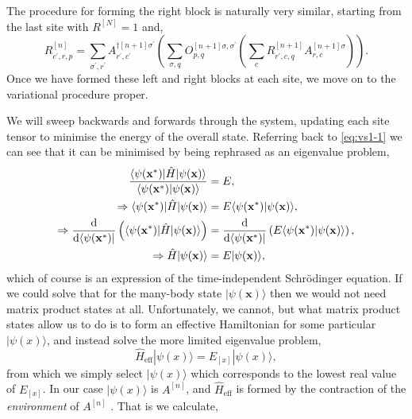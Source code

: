 The procedure for forming the right block is naturally very similar, starting from the last site with \(R^{[N]} = 1\) and,
\begin{equation}
R^{[n]}_{c^{\prime}, r, p} = \sum_{\sigma^{\prime}, r^{\prime}} A^{\dagger [n+1] \sigma^{\prime}}_{r^{\prime}, c^{\prime}} \left( \sum_{\sigma, q} O^{[n+1] \sigma, \sigma^{\prime}}_{p, q} \left( \sum_{c} R^{[n+1]}_{r^{\prime}, c, q} A^{[n+1] \sigma}_{r, c} \right) \right).  
\label{eq:vs1-5}
\end{equation}
Once we have formed these left and right blocks at each site, we move on to the variational procedure proper. 

We will sweep backwards and forwards through the system, updating each site tensor to minimise the energy of the overall state. Referring back to \cref{eq:vs1-1} we can see that it can be minimised by being rephrased as an eigenvalue problem,
\begin{align}
\frac{\langle \psi(\mathbf{x}^{*}) | \hat{H} | \psi(\mathbf{x}) \rangle}{\langle \psi(\mathbf{x}^{*}) | \psi(\mathbf{x}) \rangle } &= E, \notag \\
\Rightarrow \langle \psi(\mathbf{x}^{*}) | \hat{H} | \psi(\mathbf{x}) \rangle &= E \langle \psi(\mathbf{x}^{*}) | \psi(\mathbf{x}) \rangle, \notag \\
\Rightarrow \frac{\mathrm{d}}{\mathrm{d}\langle \psi(\mathbf{x}^{*}) |} \left( \langle \psi(\mathbf{x}^{*}) | \hat{H} | \psi(\mathbf{x}) \rangle \right) &= \frac{\mathrm{d}}{\mathrm{d}\langle \psi(\mathbf{x}^{*}) |} \left(  E \langle \psi(\mathbf{x}^{*}) | \psi(\mathbf{x}) \rangle \right), \notag \\
\Rightarrow \hat{H} |\psi(\mathbf{x}) \rangle &= E | \psi(\mathbf{x}) \rangle,
\label{eq:vs1-6}
\end{align}
which of course is an expression of the time-independent Schr\"{o}dinger equation. If we could solve that for the many-body state \(| \psi (\mathbf{x}) \rangle\) then we would not need matrix product states at all. Unfortunately, we cannot, but what matrix product states allow us to do is to form an effective Hamiltonian for some particular \(| \psi(x) \rangle\), and instead solve the more limited eigenvalue problem,
\begin{equation}
\hat{H}_{\mathrm{eff}} |\psi(x) \rangle = E_{[x]} |\psi(x) \rangle,
\label{eq:vs1-7}
\end{equation}
from which we simply select \(|\psi(x) \rangle\) which corresponds to the lowest real value of \(E_{[x]}\). In our case \(|\psi(x) \rangle\) is \(A^{[n]}\), and \(\hat{H}_{\mathrm{eff}}\) is formed by the contraction of the \emph{environment} of \(A^{[n]}\) \cite{Orus14}. That is we calculate,
